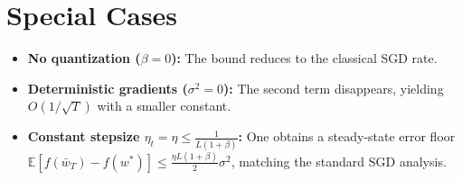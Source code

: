 \documentclass{article}
\newcommand{\E}{\mathbb{E}}
\begin{document}
\section*{Special Cases}
\begin{itemize}
    \item \textbf{No quantization ($\beta=0$):} The bound reduces to the classical SGD rate.
    \item \textbf{Deterministic gradients ($\sigma^{2}=0$):} The second term disappears, yielding $O(1/\sqrt{T})$ with a smaller constant.
    \item \textbf{Constant stepsize $\eta_t=\eta\le\frac{1}{L(1+\beta)}$:} One obtains a steady‑state error floor
    $\E[f(\bar w_T)-f(w^{*})]\le \frac{\eta L(1+\beta)}{2}\sigma^{2}$,
    matching the standard SGD analysis.
\end{itemize}
\end{document}
